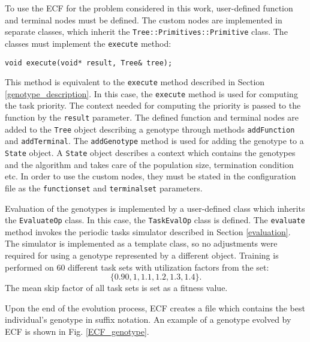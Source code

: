 To use the ECF for the problem considered in this work, user-defined function and terminal nodes must be defined.
The custom nodes are implemented in separate classes, which inherit the \texttt{Tree::Primitives::Primitive} class.
The classes must implement the \texttt{execute} method:
\begin{lstlisting}[frame=none, label={exec}, caption={A prototype of the \texttt{execute} method.}, captionpos=b]
    void execute(void* result, Tree& tree);
\end{lstlisting}
This method is equivalent to the \texttt{execute} method described in Section \ref{genotype_description}.
In this case, the \texttt{execute} method is used for computing the task priority.
The context needed for computing the priority is passed to the function by the \texttt{result} parameter.
The defined function and terminal nodes are added to the \texttt{Tree} object  describing a genotype through methods \texttt{addFunction} and \texttt{addTerminal}.
The \texttt{addGenotype} method is used for adding the genotype to a \texttt{State} object.
A \texttt{State} object describes a context which contains the genotypes and the algorithm and takes care of the population size, termination condition etc.
In order to use the custom nodes, they must be stated in the configuration file as the \texttt{functionset} and \texttt{terminalset} parameters.

Evaluation of the genotypes is implemented by a user-defined class which inherits the \texttt{EvaluateOp} class.
In this case, the \texttt{TaskEvalOp} class is defined.
The \texttt{evaluate} method invokes the periodic tasks simulator described in Section
\ref{evaluation}.
The simulator is implemented as a template class, so no adjustments were required for using a genotype represented by a different object.
Training is performed on 60 different task sets with utilization factors from the set:
\begin{equation*}
\{ 0.90, 1, 1.1, 1.2, 1.3, 1.4 \}.
\end{equation*}
The mean skip factor of all task sets is set as a fitness value.

Upon the end of the evolution process, ECF creates a file which contains the best individual's genotype in suffix notation.
An example of a genotype evolved by ECF is shown in Fig. \ref{ECF_genotype}.

